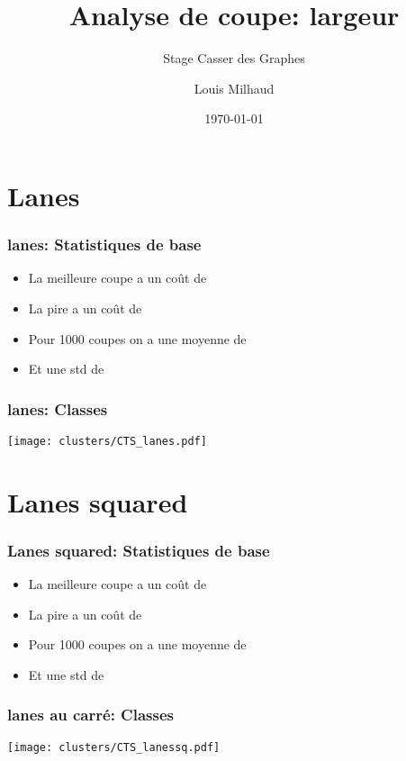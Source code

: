 \documentclass[aspectratio=169]{beamer}
\title{Analyse de coupe: largeur}
\subtitle{Stage Casser des Graphes}
\author{Louis Milhaud}
\institute{Complex Networks - LIP6}
\date{\today}
\begin{document}
    \begin{frame}
        \titlepage
    \end{frame}

    \section{Lanes}
    \begin{frame}
        \frametitle{lanes: Statistiques de base}

        \begin{itemize}
            \item La meilleure coupe a un coût de 
            \item La pire a un coût de 
            \item Pour 1000 coupes on a une moyenne de 
            \item Et une std de 
        \end{itemize}
    \end{frame}

    \begin{frame}
        \frametitle{lanes: Classes}
        \centering
        \texttt{[image: clusters/CTS\_lanes.pdf]}
    \end{frame}

    \section{Lanes squared}
    \begin{frame}
        \frametitle{Lanes squared: Statistiques de base}
    
        \begin{itemize}
            \item La meilleure coupe a un coût de 
            \item La pire a un coût de 
            \item Pour 1000 coupes on a une moyenne de 
            \item Et une std de 
        \end{itemize}

    \end{frame}
    \begin{frame}
        \frametitle{lanes au carré: Classes}
        \centering
        \texttt{[image: clusters/CTS\_lanessq.pdf]}
    \end{frame}
\end{document}
